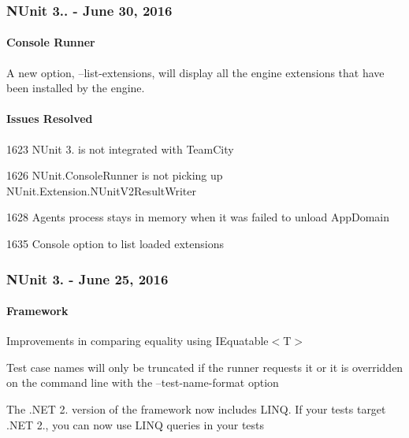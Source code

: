 \subsubsection*{N\+Unit 3.. -\/ June 30, 2016}

\paragraph*{Console Runner}


\begin{DoxyItemize}
\item A new option, --list-\/extensions, will display all the engine extensions that have been installed by the engine.
\end{DoxyItemize}

\paragraph*{Issues Resolved}


\begin{DoxyItemize}
\item 1623 N\+Unit 3. is not integrated with Team\+City
\item 1626 N\+Unit.\+Console\+Runner is not picking up N\+Unit.\+Extension.\+N\+Unit\+V2\+Result\+Writer
\item 1628 Agent\textquotesingle{}s process stays in memory when it was failed to unload App\+Domain
\item 1635 Console option to list loaded extensions
\end{DoxyItemize}

\subsubsection*{N\+Unit 3. -\/ June 25, 2016}

\paragraph*{Framework}


\begin{DoxyItemize}
\item Improvements in comparing equality using {\ttfamily I\+Equatable$<$T$>$}
\item Test case names will only be truncated if the runner requests it or it is overridden on the command line with the --test-\/name-\/format option
\item The .N\+ET 2. version of the framework now includes L\+I\+NQ. If your tests target .N\+ET 2., you can now use L\+I\+NQ queries in your tests
\end{DoxyItemize}

